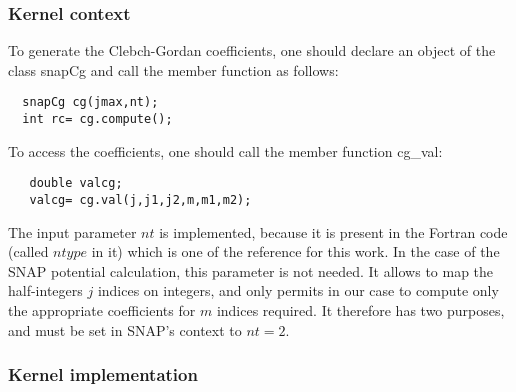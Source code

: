 \documentclass[12pt]{article}
\begin{document}
      \subsubsection{Kernel context}
    To generate the Clebch-Gordan coefficients, one should declare an object of the class snapCg and call the member function as follows:\\
	\begin{lstlisting}
  snapCg cg(jmax,nt);     
  int rc= cg.compute();
	\end{lstlisting}
   To access the coefficients, one should call the member function cg\_val:
	\begin{lstlisting}
   double valcg;
   valcg= cg.val(j,j1,j2,m,m1,m2);
	\end{lstlisting}

   The input parameter $nt$ is implemented, because it is present in the Fortran code (called $ntype$ in it) which is one of the reference for this work. In the case of the SNAP potential calculation, this parameter is not needed. It allows to map the half-integers $j$ indices on integers, and only permits in our case to compute only the appropriate coefficients for $m$ indices required. It therefore has two purposes, and must be set in SNAP's context to $nt=2$. 
      \subsubsection{Kernel implementation}
\end{document}
